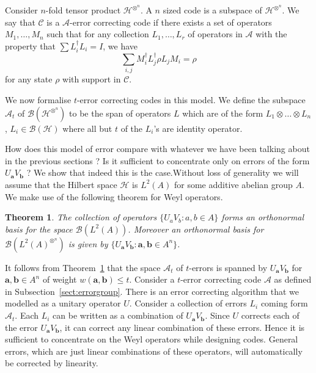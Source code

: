\documentclass[11pt,twoside]{article}
\newtheorem{theorem}{Theorem}[section]
\theoremstyle{definition}
\theoremstyle{remark}
\newcommand{\Weight}[1]{\ensuremath{w\left(#1\right)}}
\newcommand{\LN}[1]{\ensuremath{L^2\left(#1\right)^{\otimes^n}}}
\newcommand{\Oper}[1]{\ensuremath{\mathcal{B}\left(#1\right)}}
\begin{document}
Consider $n$-fold tensor product $\mathcal{H}^{\otimes^n}$.  A $n$
sized code is a subspace of $\mathcal{H}^{\otimes^n}$. We say that
$\mathcal{C}$ is a $\mathcal{A}$-error correcting code if there exists
a set of operators $M_1,\ldots,M_n$ such that for any collection
$L_1,\ldots,L_r$ of operators in $\mathcal{A}$ with the property that
$\sum L_i^\dag L_i = I$, we have
\[
\sum_{i,j} M_i^\dag L_j^\dag \rho L_j M_i = \rho
\]
for any state $\rho$ with support in $\mathcal{C}$.

We now formalise $t$-error correcting codes in this model. We define
the subspace $\mathcal{A}_t$ of $\Oper{\mathcal{H}^{\otimes^n}}$ to be
the span of operators $L$ which are of the form $L_1 \otimes \ldots
\otimes L_n$, $L_i \in \Oper{\mathcal{H}}$ where all but $t$ of the
$L_i$'s are identity operator.


How does this model of error compare with whatever we have been
talking about in the previous sections ? Is it sufficient to
concentrate only on errors of the form $U_{\mathbf{a}}V_{\mathbf{b}}$
? We show that indeed this is the case.Without loss of generality we
will assume that the Hilbert space $\mathcal{H}$ is $L^2(A)$ for some
additive abelian group $A$.  We make use of the following theorem for
Weyl operators.

\begin{theorem}\label{thm:weyl:oper}
  The collection of operators $\{ U_a V_b : a, b \in A\}$ forms an
  orthonormal basis for the space $\Oper{L^2(A)}$. Moreover an
  orthonormal basis for $\Oper{\LN{A}}$ is given by $\{ U_{\mathbf{a}}
  V_{\mathbf{b}} : \mathbf{a},\mathbf{b} \in A^n \}$.
\end{theorem}

It follows {from} Theorem~\ref{thm:weyl:oper} that the space
$\mathcal{A}_t$ of $t$-errors is spanned by $ U_{\mathbf{a}}
V_{\mathbf{b}}$ for $\mathbf{a},\mathbf{b} \in A^n$ of weight $
\Weight{\mathbf{a},\mathbf{b}} \leq t$. Consider a $t$-error
correcting code $\mathcal{A}$ as defined in
Subsection~\ref{sect:errorgroup}. There is an error correcting
algorithm that we modelled as a unitary operator $U$. Consider a
collection of errors $L_i$ coming form $\mathcal{A}_t$. Each $L_i$ can
be written as a combination of $U_{\mathbf{a}}V_{\mathbf{b}}$. Since
$U$ corrects each of the error $U_{\mathbf{a}}V_{\mathbf{b}}$, it can
correct any linear combination of these errors. Hence it is sufficient
to concentrate on the Weyl operators while designing codes. General
errors, which are just linear combinations of these operators, will
automatically be corrected by linearity.
\end{document}
